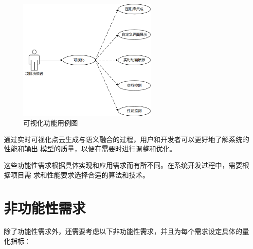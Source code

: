 \begin{enumerate}
	\begin{figure}[htb]
		\centering
		\includegraphics[width=0.618\textwidth]{figures/uml/case6.png}
		\caption{可视化功能用例图}
		\label{fig:case6}
	\end{figure}

	\par 通过实时可视化点云生成与语义融合的过程，用户和开发者可以更好地了解系统的性能和输出
	模型的质量，以便在需要时进行调整和优化。

\end{enumerate}

\par 这些功能性需求根据具体实现和应用需求而有所不同。在系统开发过程中，需要根据项目需
求和性能要求选择合适的算法和技术。

\section{非功能性需求}
\par 除了功能性需求外，还需要考虑以下非功能性需求，并且为每个需求设定具体的量化指标：

